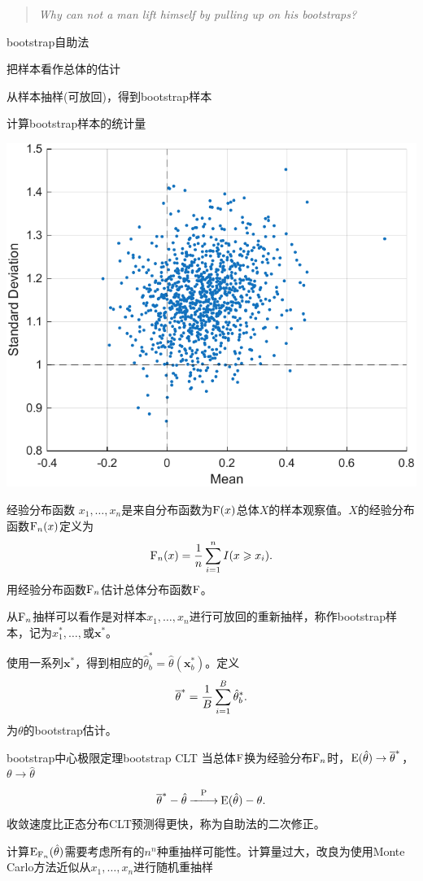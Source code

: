 \begin{quote}
	\textit{Why can not a man lift himself by pulling up on his bootstraps?}
\end{quote}
\begin{method}{bootstrap自助法}{}
	\begin{compactenum}
		\item 把样本看作总体的估计
		\item 从样本抽样(可放回)，得到bootstrap样本
		\item 计算bootstrap样本的统计量
	\end{compactenum}
	\begin{center}
		\includegraphics[width=0.6\linewidth]{figures/bootstrap.pdf}
		\label{fig:bootstrap}
	\end{center}
\end{method}
\begin{definition}{经验分布函数}{}
	$x_1,\ldots,x_n$是来自分布函数为$\operatorname{F}(x)$总体$X$的样本观察值。$X$的经验分布函数$\operatorname{F}_n(x)$定义为
	\begin{equation}
		\operatorname{F}_n(x)=\frac1n\sum_{i=1}^nI(x\geqslant x_i).
	\end{equation}
	用经验分布函数$\operatorname{F}_n$估计总体分布函数$\operatorname{F}$。
\end{definition}
从$\operatorname{F}_n$抽样可以看作是对样本$x_1,\ldots,x_n$进行可放回的重新抽样，称作bootstrap样本，记为$x_1^\ast,\ldots,$或$\bm x^\ast$。

使用一系列$\bm x^\ast$，得到相应的$\hat\theta_b^\ast=\hat\theta(\bm x_b^\ast)$。定义
\[
	\overline{\theta}^\ast=\frac1B\sum_{i=1}^B\hat\theta_b^\ast.
\]
为$\theta$的bootstrap估计。
\begin{theorem}{bootstrap中心极限定理}{bootstrap CLT}
	当总体$\operatorname{F} $换为经验分布$\operatorname{F}_n $时，$\operatorname{E}(\hat\theta)\to\overline{\theta}^\ast$，$\theta\to\hat\theta$
	\begin{equation}
		\overline{\theta}^\ast-\hat\theta\overset{\operatorname{P}}{-\hspace{-4pt}-\hspace{-5pt}\longrightarrow}\operatorname{E}(\hat\theta)-\theta.
	\end{equation}
	收敛速度比正态分布CLT预测得更快，称为自助法的二次修正。
\end{theorem}
计算$\operatorname{E}_{\operatorname{F}_n}(\hat\theta)$需要考虑所有的$n^n$种重抽样可能性。计算量过大，改良为使用Monte Carlo方法近似从$ x_1, \ldots, x_n $进行随机重抽样